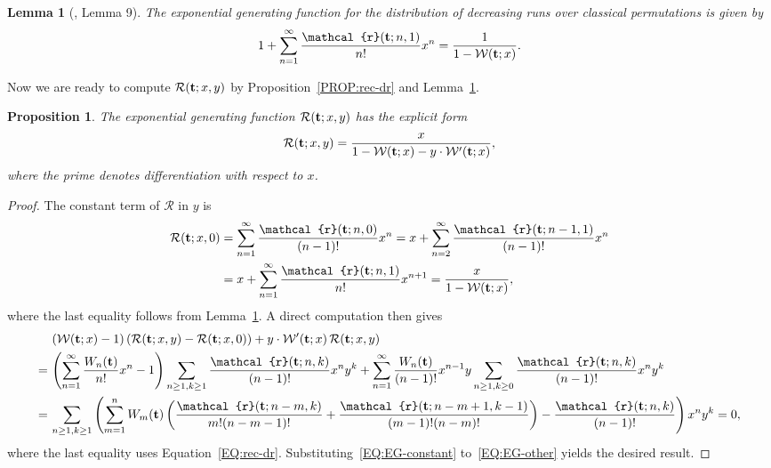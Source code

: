 \documentclass[11pt]{article}
\newcommand{\vt} { {\bf t}}
\newcommand{\vx} { {\bf x}}
\numberwithin{equation}{section}
\newtheorem{lem}[thm]{Lemma}
\newtheorem{prop}[thm]{Proposition}
\def\cR{\mathcal{R}}
\def\cW{\mathcal{W}}
\newcommand{\ccr}{\mathcal{r}}
\begin{document}

\begin{lem}[\cite{GesselZhuang2014}, Lemma 9]\label{LEM:EG-constant}
	The exponential generating function for the distribution of decreasing runs over classical permutations is given by
	\[
	1+\sum_{n=1}^{\infty}\frac{\ccr(\vt;n,1)}{n!}x^n=\frac{1}{1-\cW(\vt;x)}.
	\]
\end{lem}

Now we are ready to compute $\cR(\vt;x,y)$ by Proposition~\ref{PROP:rec-dr} and Lemma~\ref{LEM:EG-constant}.

\begin{prop}\label{PROP:cR}
	The exponential generating function $\cR(\vt;x,y)$ has the explicit form
	\begin{align}\label{EQ:cR}
	\cR(\vt;x,y)=\frac{x}{1-\cW(\vt;x)-y\cdot \cW'(\vt;x)},
	\end{align}
	where the prime denotes differentiation with respect to $x$.
\end{prop}
\begin{proof}
	The constant term of $\cR$ in $y$ is
	\begin{align}\label{EQ:EG-constant}
	\cR(\vt;x,0)&=\sum_{n=1}^{\infty}\frac{\ccr(\vt;n,0)}{(n-1)!}x^n
	=x+\sum_{n=2}^{\infty}\frac{\ccr(\vt;n-1,1)}{(n-1)!}x^n\nonumber\\
	&=x+\sum_{n=1}^{\infty}\frac{\ccr(\vt;n,1)}{n!}x^{n+1}
	=\frac{x}{1-\cW(\vt;x)},
	\end{align}
	where the last equality follows from Lemma~\ref{LEM:EG-constant}. A direct computation then gives
	\begin{align}\label{EQ:EG-other}
	&\left(\cW(\vt;x)-1\right)\left(\cR(\vt;x,y)-\cR(\vt;x,0)\right)+y\cdot \cW'(\vt;x)\,\cR(\vt;x,y)\\
	=\,&\left(\sum_{n=1}^{\infty}\frac{W_n(\vt)}{n!}x^n-1\right)\sum_{n\geq1,k\geq1}\frac{\ccr(\vt;n,k)}{(n-1)!}x^ny^k+\sum_{n=1}^{\infty}\frac{W_n(\vt)}{(n-1)!}x^{n-1}y\sum_{n\geq1,k\geq0}\frac{\ccr(\vt;n,k)}{(n-1)!}x^ny^k\nonumber\\
	=\,&\sum_{n\geq1,k\geq1}\left(\sum_{m=1}^{n}W_m(\vt)\left(\frac{\ccr(\vt;n-m,k)}{m!(n-m-1)!}+\frac{\ccr(\vt;n-m+1,k-1)}{(m-1)!(n-m)!}\right)-\frac{\ccr(\vt;n,k)}{(n-1)!}\right)x^ny^k=0,\nonumber
	\end{align}
	where the last equality uses Equation~\eqref{EQ:rec-dr}. Substituting~\eqref{EQ:EG-constant} to~\eqref{EQ:EG-other} yields the desired result.
\end{proof}
\end{document}
